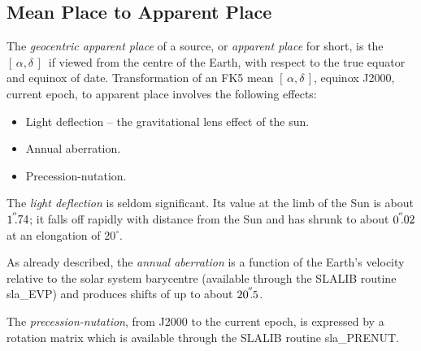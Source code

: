 \documentclass[11pt,twoside]{article}
\newcommand{\radec}     {$[\,\alpha,\delta\,]$}
\newcommand{\arcsec}[2] {\arcseci{#1}$\hspace{-0.4em}.#2$}
\newcommand{\arcsec}[2] {
      {$#1\hspace{-0.05em}^{'\hspace{-0.1em}'}\hspace{-0.4em}.#2$}
   }
\newcommand{\arcseci}[1] {$#1\hspace{-0.05em}$\raisebox{-0.5ex}
                         {$^{'\hspace{-0.1em}'}$}}
\renewcommand{\arcseci}[1] {$#1\hspace{-0.05em}^{'\hspace{-0.1em}'}$}
\begin{document}
\subsection {Mean Place to Apparent Place}
The {\it geocentric apparent place}\/ of a source, or {\it apparent place}\/
for short,
is the \radec\ if viewed from the centre of the Earth,
with respect to the true equator and equinox of date.
Transformation of an FK5 mean \radec, equinox J2000,
current epoch, to apparent place involves the following effects:
\goodbreak
\begin{itemize}
   \item Light deflection -- the gravitational lens effect of
         the sun.
   \item Annual aberration.
   \item Precession-nutation.
\end{itemize}
The {\it light deflection}\/ is seldom significant.  Its value
at the limb of the Sun is about
\arcsec{1}{74};  it falls off rapidly with distance from the
Sun and has shrunk to about
\arcsec{0}{02} at an elongation of $20^\circ$.

As already described, the {\it annual aberration}\/
is a function of the Earth's velocity
relative to the solar system barycentre (available through the
SLALIB routine
sla\_EVP)
and produces shifts of up to about \arcsec{20}{5}.

The {\it precession-nutation}, from J2000 to the current epoch, is
expressed by a rotation matrix which is available through the
SLALIB routine
sla\_PRENUT.
\end{document}
